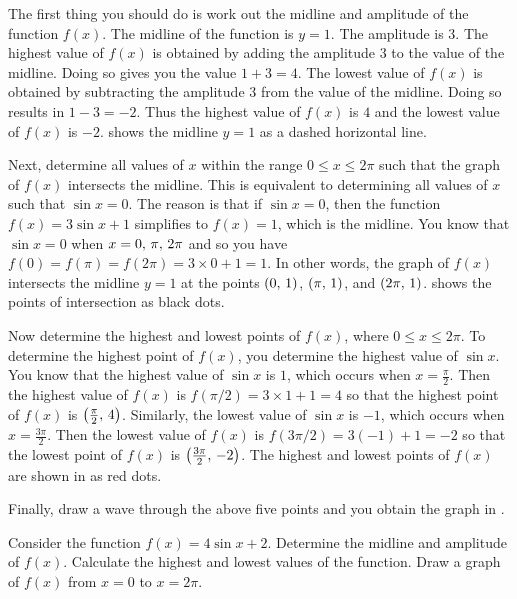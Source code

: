 \documentclass[a4paper,oneside,12pt]{article}
\begin{document}
\begin{solution}
The first thing you should do is work out the midline and amplitude of
the function $f(x)$.  The midline of the function is $y = 1$.  The
amplitude is $3$.  The highest value of $f(x)$ is obtained by adding
the amplitude $3$ to the value of the midline.  Doing so gives you the
value $1 + 3 = 4$.  The lowest value of $f(x)$ is obtained by
subtracting the amplitude $3$ from the value of the midline.  Doing so
results in $1 - 3 = -2$.  Thus the highest value of $f(x)$ is $4$ and
the lowest value of $f(x)$ is $-2$.
 shows the midline $y = 1$ as a
dashed horizontal line.

Next, determine all values of $x$ within the range
$0 \leq x \leq 2\pi$ such that the graph of $f(x)$ intersects the
midline.  This is equivalent to determining all values of $x$ such
that $\sin x = 0$.  The reason is that if $\sin x = 0$, then the
function $f(x) = 3 \sin x + 1$ simplifies to $f(x) = 1$, which is the
midline.  You know that $\sin x = 0$ when
$x = {0},\, {\pi},\, {2\pi}$ and so you have
$f(0) = f(\pi) = f(2\pi) = 3 \times 0 + 1 = 1$.  In other words, the
graph of $f(x)$ intersects the midline $y = 1$ at the points
$\left\lparen{0},\, {1}\right\rparen$, $\left\lparen{\pi},\, {1}\right\rparen$, and $\left\lparen{2\pi},\, {1}\right\rparen$.
 shows the points of
intersection as black dots.

Now determine the highest and lowest points of $f(x)$, where
$0 \leq x \leq 2\pi$.  To determine the highest point of $f(x)$, you
determine the highest value of $\sin x$.  You know that the highest
value of $\sin x$ is $1$, which occurs when $x = \frac{\pi}{2}$.  Then
the highest value of $f(x)$ is $f(\pi/2) = 3 \times 1 + 1 = 4$ so that
the highest point of $f(x)$ is $\left\lparen{\frac{\pi}{2}},\, {4}\right\rparen$.  Similarly,
the lowest value of $\sin x$ is $-1$, which occurs when
$x = \frac{3\pi}{2}$.  Then the lowest value of $f(x)$ is
$f(3\pi/2) = 3(-1) + 1 = -2$ so that the lowest point of $f(x)$ is
$\left\lparen{\frac{3\pi}{2}},\, {-2}\right\rparen$.  The highest and lowest points of $f(x)$
are shown in  as red dots.

Finally, draw a wave through the above five points and you obtain the
graph in .
\end{solution}

\begin{exercise}
Consider the function $f(x) = 4 \sin x + 2$.  Determine the midline
and amplitude of $f(x)$.  Calculate the highest and lowest values of
the function.  Draw a graph of $f(x)$ from $x = 0$ to $x = 2\pi$.
\end{exercise}
\end{document}
